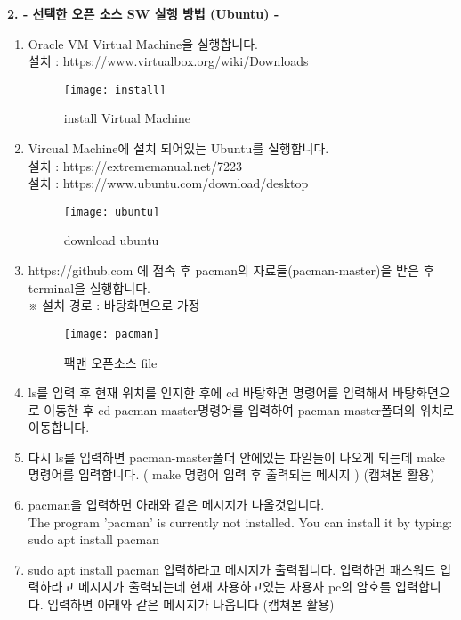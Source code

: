 \documentclass{article}
\begin{document}
 
\begin{large}\textbf{2. - 선택한 오픈 소스 SW 실행 방법 (Ubuntu) -}\end{large}
\begin{enumerate}
\item Oracle VM Virtual Machine을 실행합니다. \\

설치 : https://www.virtualbox.org/wiki/Downloads\\ 
 \begin{figure}[!h]
\centering
\texttt{[image: install]}
\caption{install Virtual Machine}%
\end{figure}

\newpage

\item Vircual Machine에 설치 되어있는 Ubuntu를 실행합니다. \\
설치 : https://extrememanual.net/7223\\
설치 : https://www.ubuntu.com/download/desktop\\

 \begin{figure}[!h]
\centering
\texttt{[image: ubuntu]}
\caption{download ubuntu}%
\end{figure}

\item https://github.com 에 접속 후 pacman의 자료들(pacman-master)을 받은 후 terminal을 실행합니다. \\※ 설치 경로 : 바탕화면으로 가정\\

 \begin{figure}[!h]
\centering
\texttt{[image: pacman]}
\caption{팩맨 오픈소스 file}%
\end{figure}

\item ls를 입력 후 현재 위치를 인지한 후에 cd 바탕화면 명령어를 입력해서 바탕화면으로 이동한 후 cd pacman-master명령어를 입력하여 pacman-master폴더의 위치로 이동합니다.\\
\item 다시 ls를 입력하면 pacman-master폴더 안에있는 파일들이 나오게 되는데 make 명령어를 입력합니다. ( make 명령어 입력 후 출력되는 메시지 ) (캡쳐본 활용)\\
\item pacman을 입력하면 아래와 같은 메시지가 나올것입니다. \\
The program 'pacman' is currently not installed. You can install it by typing: sudo apt install pacman\\
\item sudo apt install pacman 입력하라고 메시지가 출력됩니다. 입력하면 패스워드 입력하라고 메시지가 출력되는데 현재 사용하고있는 사용자 pc의 암호를 입력합니다. 입력하면 아래와 같은 메시지가 나옵니다 (캡쳐본 활용)
\end{enumerate}
\end{document}
